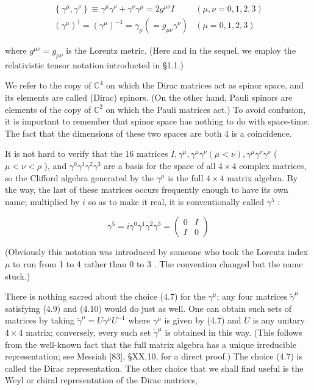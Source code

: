 \documentclass[10pt, letterpaper]{article}
\begin{document}
$$
\begin{aligned}
\left\{\gamma^{\mu}, \gamma^{\nu}\right\} \equiv \gamma^{\mu} \gamma^{\nu}+\gamma^{\nu} \gamma^{\mu}=2 g^{\mu \nu} I & (\mu, \nu=0,1,2,3) \\
\left(\gamma^{\mu}\right)^{\dagger}=\left(\gamma^{\mu}\right)^{-1}=\gamma_{\mu}\left(=g_{\mu \nu} \gamma^{\nu}\right) & (\mu=0,1,2,3)
\end{aligned}
$$

where $g^{\mu \nu}=g_{\mu \nu}$ is the Lorentz metric. (Here and in the sequel, we employ the relativistic tensor notation introducted in §1.1.)

We refer to the copy of $\mathbb{C}^{4}$ on which the Dirac matrices act as spinor space, and its elements are called (Dirac) spinors. (On the other hand, Pauli spinors are elements of the copy of $\mathbb{C}^{2}$ on which the Pauli matrices act.) To avoid confusion, it is important to remember that spinor space has nothing to do with space-time. The fact that the dimensions of these two spaces are both 4 is a coincidence.

It is not hard to verify that the 16 matrices $I, \gamma^{\mu}, \gamma^{\mu} \gamma^{\nu}(\mu<\nu), \gamma^{\mu} \gamma^{\nu} \gamma^{\rho}$ ( $\mu<\nu<\rho$ ), and $\gamma^{0} \gamma^{1} \gamma^{2} \gamma^{3}$ are a basis for the space of all $4 \times 4$ complex matrices, so the Clifford algebra generated by the $\gamma^{\mu}$ is the full $4 \times 4$ matrix algebra. By the way, the last of these matrices occurs frequently enough to have its own name; multiplied by $i$ so as to make it real, it is conventionally called $\gamma^{5}$ :

$$
\gamma^{5}=i \gamma^{0} \gamma^{1} \gamma^{2} \gamma^{3}=\left(\begin{array}{ll}
0 & I \\
I & 0
\end{array}\right)
$$

(Obviously this notation was introduced by someone who took the Lorentz index $\mu$ to run from 1 to 4 rather than 0 to 3 . The convention changed but the name stuck.)

There is nothing sacred about the choice (4.7) for the $\gamma^{\mu}$; any four matrices $\widetilde{\gamma}^{\mu}$ satisfying (4.9) and (4.10) would do just as well. One can obtain such sets of matrices by taking $\widetilde{\gamma}^{\mu}=U \gamma^{\mu} U^{-1}$ where $\gamma^{\mu}$ is given by (4.7) and $U$ is any unitary $4 \times 4$ matrix; conversely, every such set $\widetilde{\gamma}^{\mu}$ is obtained in this way. (This follows from the well-known fact that the full matrix algebra has a unique irreducible representation; see Messiah [83], §XX.10, for a direct proof.) The choice (4.7) is called the Dirac representation. The other choice that we shall find useful is the Weyl or chiral representation of the Dirac matrices,
\end{document}
